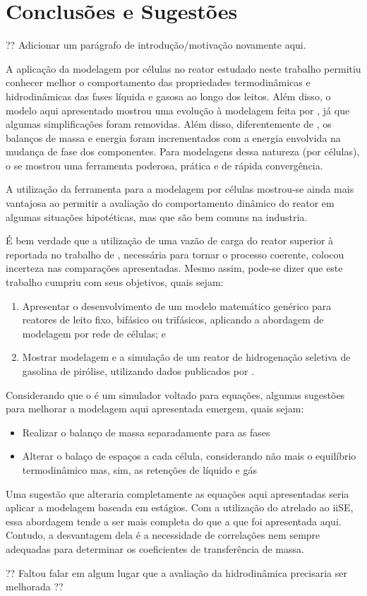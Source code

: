 %
% 
%
\chapter{Conclusões e Sugestões} \label{chap:conclusoes}
%

?? Adicionar um parágrafo de introdução/motivação novamente aqui.

A aplicação da modelagem por células no reator estudado neste trabalho permitiu
conhecer melhor o comportamento das propriedades termodinâmicas e hidrodinâmicas
das fases líquida e gasosa ao longo dos leitos. Além disso, o modelo aqui
apresentado mostrou uma evolução à modelagem feita por ,
já que algumas simplificações foram removidas. Além disso,
diferentemente de , os balanços de massa e energia foram
incrementados com a energia envolvida na mudança de fase dos componentes. Para
modelagens dessa natureza (por células), o \emso{} se mostrou uma ferramenta
poderosa, prática e de rápida convergência.

A utilização da ferramenta \emso{} para a modelagem por células mostrou-se
ainda mais vantajosa ao permitir a avaliação do comportamento dinâmico do reator
em algumas situações hipotéticas, mas que são bem comuns na industria.

É bem verdade que a utilização de uma vazão de carga do reator superior à
reportada no trabalho de , necessária para
tornar o processo coerente, colocou incerteza nas comparações apresentadas.
Mesmo assim, pode-se dizer que este trabalho cumpriu com seus objetivos,
quais sejam:

\begin{enumerate}
  \item Apresentar o desenvolvimento de um modelo matemático genérico para
  reatores de leito fixo, bifásico ou trifásicos, aplicando a abordagem de
  modelagem por rede de células; e 
  \item Mostrar modelagem e a simulação de um reator de hidrogenação seletiva
  de gasolina de pirólise, utilizando dados publicados por
  .
\end{enumerate}

Considerando que o \emso{} é um simulador voltado para equações, algumas
sugestões para melhorar a modelagem aqui apresentada emergem, quais sejam:

\begin{itemize}
\item {Realizar o balanço de massa separadamente para as fases}
\item {Alterar o balaço de espaços a cada célula, considerando não mais o
equilíbrio termodinâmico mas, sim, as retenções de líquido e gás}
\end{itemize}

Uma sugestão que alteraria completamente as equações aqui apresentadas seria
aplicar a modelagem baseada em estágios. Com a utilização do \emso{} atrelado ao
iiSE, essa abordagem tende a ser mais completa do que a que foi apresentada
aqui. Contudo, a desvantagem dela é a necessidade de correlações nem sempre
adequadas para determinar os coeficientes de transferência de massa.

?? Faltou falar em algum lugar que a avaliação da hidrodinâmica precisaria ser
melhorada ??